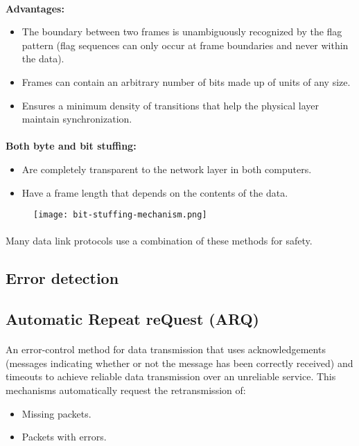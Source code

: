 \documentclass[../resumosRCOM.tex]{subfiles}
\begin{document}
\paragraph{}
\textbf{Advantages:}
\begin{itemize}
    \item The boundary between two frames is unambiguously recognized by the
    flag pattern (flag sequences can only occur at frame boundaries and never
    within the data).
    \item Frames can contain an arbitrary number of bits made up of units of any
    size.
    \item Ensures a minimum density of transitions that help the physical layer
    maintain synchronization. 
\end{itemize}

\paragraph{}
\textbf{Both byte and bit stuffing:}
\begin{itemize}
    \item Are completely transparent to the network layer in both computers.
    \item Have a frame length that depends on the contents of the data.
\end{itemize}

\begin{figure}[H]
    \centering
    \texttt{[image: bit-stuffing-mechanism.png]}
\end{figure}

\paragraph{}
Many data link protocols use a combination of these methods for safety.

\subsection{Error detection}
\subsection{Automatic Repeat reQuest (ARQ)}
\paragraph{}
An error-control method for data transmission that uses acknowledgements
(messages indicating whether or not the message has been correctly received)
and timeouts to achieve reliable data transmission over an unreliable service.
This mechanisms automatically request the retransmission of:
\begin{itemize}
    \item Missing packets.
    \item Packets with errors.
\end{itemize}
\end{document}
